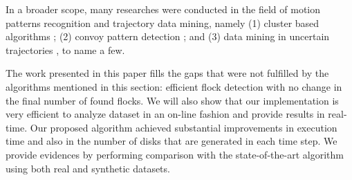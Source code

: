 In a broader scope, many researches were conducted in the field of motion patterns recognition and trajectory data
mining, namely (1) cluster based algorithms
\cite{bib:clusters1}\cite{bib:movingclusters}\cite{bib:clusters2}\cite{bib:clusters3}; (2) convoy pattern detection
\cite{bib:convoy}\cite{bib:flockpedestrian}\cite{bib:convoy2}\cite{bib:convoy3}; and (3) data mining in uncertain
trajectories \cite{bib:uncertain1}\cite{bib:uncertain2}\cite{bib:uncertain3}\cite{bib:uncertain4}, to name a few.

The work presented in this paper fills the gaps that were not fulfilled by the algorithms mentioned in this section:
efficient flock detection with no change in the final number of found flocks. We will also show that our implementation
is very efficient to analyze dataset in an on-line fashion and provide results in real-time. Our proposed algorithm
achieved substantial improvements in execution time and also in the number of disks that are generated in each time
step. We provide evidences by performing comparison with the state-of-the-art algorithm using both real and synthetic
datasets.
